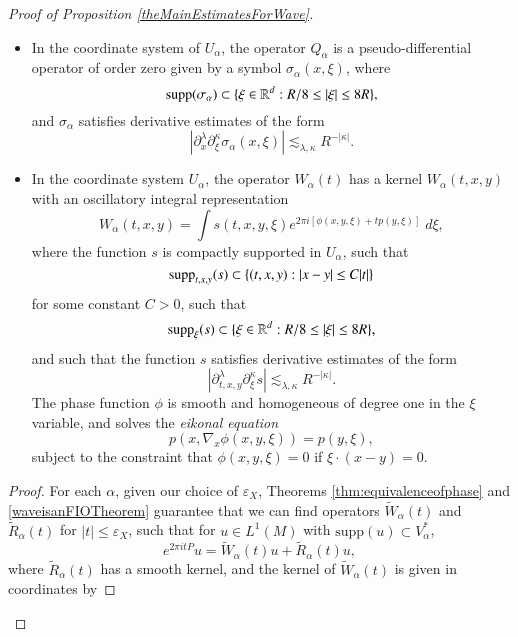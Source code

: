 \begin{proof}[Proof of Proposition \ref{theMainEstimatesForWave}]
\begin{lemma}
\begin{itemize}
        \item In the coordinate system of $U_\alpha$, the operator $Q_{\alpha}$ is a pseudo-differential operator of order zero given by a symbol $\sigma_{\alpha}(x,\xi)$, where
        \[ \operatorname{\text{supp}}(\sigma_{\alpha}) \subset \{ \xi \in \operatorname{\mathbb{R}}^d: R/8 \leq |\xi| \leq 8R \}, \]
        and $\sigma_{\alpha}$ satisfies derivative estimates of the form
        \[ |\partial^\lambda_x \partial^\kappa_\xi \sigma_{\alpha}(x,\xi)| \lesssim_{\lambda,\kappa} R^{-|\kappa|}. \]

        \item In the coordinate system $U_\alpha$, the operator $W_\alpha(t)$ has a kernel $W_\alpha(t,x,y)$ with an oscillatory integral representation
        \[ W_\alpha(t,x,y) = \int s(t,x,y,\xi) e^{2 \pi i [ \phi(x,y,\xi) + t p(y,\xi) ]}\; d\xi, \]
        where the function $s$ is compactly supported in $U_\alpha$, such that
        \[ \operatorname{\text{supp}}_{t,x,y}(s) \subset \{ (t,x,y) : |x - y| \leq C |t| \} \]
        for some constant $C > 0$, such that
        \[ \operatorname{\text{supp}}_\xi(s) \subset \{ \xi \in \operatorname{\mathbb{R}}^d : R/8 \leq |\xi| \leq 8R \}, \]
        and such that the function $s$ satisfies derivative estimates of the form
        \[ | \partial_{t,x,y}^\lambda \partial_\xi^\kappa s | \lesssim_{\lambda, \kappa} R^{- |\kappa|}. \]
        The phase function $\phi$ is smooth and homogeneous of degree one in the $\xi$ variable, and solves the \emph{eikonal equation}
        \[ p \left( x, \nabla_x \phi(x,y,\xi) \right) = p(y,\xi), \]
        subject to the constraint that $\phi(x,y,\xi) = 0$ if $\xi \cdot (x - y) = 0$.
    \end{itemize}
\end{lemma}
\begin{proof}
    For each $\alpha$, given our choice of $\varepsilon_X$, Theorems \ref{thm:equivalenceofphase} and \ref{waveisanFIOTheorem} guarantee that we can find operators $\tilde{W}_\alpha(t)$ and $\tilde{R}_\alpha(t)$ for $|t| \leq \varepsilon_X$, such that for $u \in L^1(M)$ with $\text{supp}(u) \subset V_\alpha^*$,
    \begin{equation}
        e^{2 \pi i t P} u = \tilde{W}_\alpha(t) u + \tilde{R}_\alpha(t) u,
    \end{equation}
    where $\tilde{R}_\alpha(t)$ has a smooth kernel, and the kernel of $\tilde{W}_\alpha(t)$ is given in coordinates by

\end{proof}
\end{proof}
